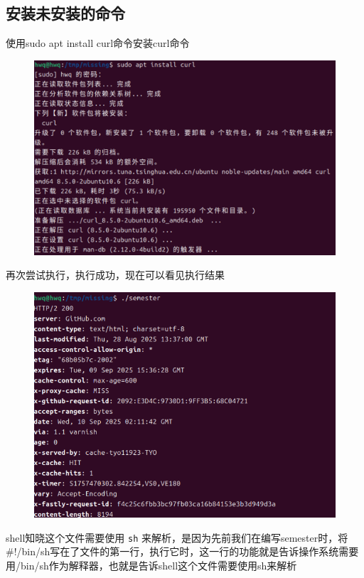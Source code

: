 \documentclass[a4paper, 12pt]{article}
\begin{document}
\subsection{安装未安装的命令}
使用sudo apt install curl命令安装curl命令
\begin{figure}[H]
    \centering
    \includegraphics[width=1\linewidth]{shell8.png}
\end{figure}
再次尝试执行，执行成功，现在可以看见执行结果
\begin{figure}[H]
    \centering
    \includegraphics[width=1\linewidth]{shell9.png}
\end{figure}

shell知晓这个文件需要使用 \verb|sh| 来解析，是因为先前我们在编写semester时，将\#!/bin/sh写在了文件的第一行，执行它时，这一行的功能就是告诉操作系统需要用/bin/sh作为解释器，也就是告诉shell这个文件需要使用sh来解析
\end{document}
